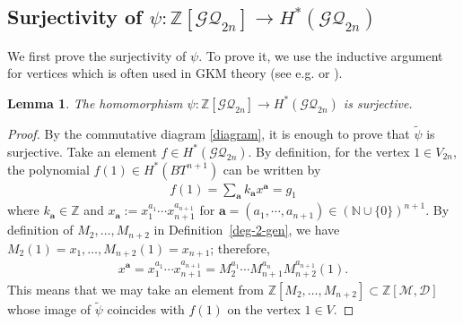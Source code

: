 \documentclass[12pt]{amsart}
\newtheorem{lemma}[theorem]{Lemma}
\theoremstyle{remark}
\numberwithin{equation}{section}
\begin{document}
\subsection{Surjectivity of $\psi:\mathbb{Z}[\mathcal{GQ}_{2n}]\to H^{*}(\mathcal{GQ}_{2n})$}
\label{sect:5.1}
We first prove the surjectivity of $\psi$.
To prove it, we use the inductive argument for vertices which is often used in GKM theory (see e.g. \cite[Lemma 4.4]{MMP} or \cite[Lemma 5.6]{KU}).
\begin{lemma}
\label{surjectivity}
The homomorphism 
$\psi:\mathbb{Z}[\mathcal{GQ}_{2n}]\to H^{*}(\mathcal{GQ}_{2n})$
is surjective.
\end{lemma}
\begin{proof}
By the commutative diagram \eqref{diagram}, 
it is enough to prove that $\widetilde{\psi}$ is surjective.
Take an element $f\in H^{*}(\mathcal{GQ}_{2n})$. 
By definition, for the vertex $1\in V_{2n}$, the polynomial $f(1)\in H^{*}(BT^{n+1})$ can be written by
\begin{align*}
f(1)=\sum_{\textbf{a}}k_{\textbf{a}}x^{\textbf{a}}=g_{1}
\end{align*}
where $k_{\textbf{a}}\in \mathbb{Z}$ and $x_{\textbf{a}}:=x_{1}^{a_{1}}\cdots x_{n+1}^{a_{n+1}}$ for $\textbf{a}=(a_{1},\cdots ,a_{n+1})\in (\mathbb{N}\cup \{0\})^{n+1}$.
By definition of $M_{2},\ldots, M_{n+2}$ in Definition~\ref{deg-2-gen},
we have $M_{2}(1)=x_{1},\ldots, M_{n+2}(1)=x_{n+1}$; therefore, 
\begin{align*}
x^{\textbf{a}}=x_{1}^{a_{1}}\cdots x_{n+1}^{a_{n+1}}=M_{2}^{a_{1}}\cdots M_{n+1}^{a_{n}}M_{n+2}^{a_{n+1}}(1).
\end{align*}
This means that we may take an element from $\mathbb{Z}[M_{2},\ldots, M_{n+2}]\subset \mathbb{Z}[\mathcal{M},\mathcal{D}]$ whose image of $\widetilde{\psi}$ coincides with $f(1)$ on the vertex $1\in V$.


\end{proof}
\end{document}

